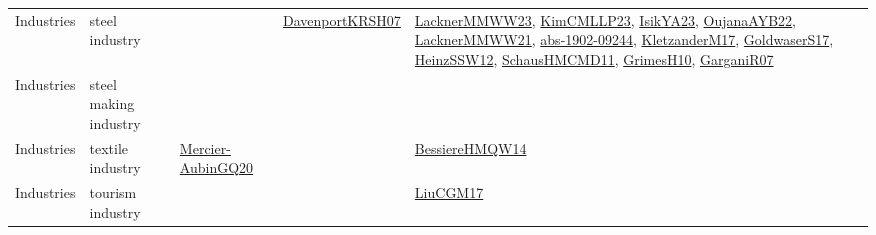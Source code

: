 {\begin{longtable}{lp{3cm}>{\raggedright}p{6cm}>{\raggedright}p{6cm}p{8cm}}
Industries & steel industry &  & \href{papers/DavenportKRSH07.pdf}{DavenportKRSH07}\cite{DavenportKRSH07} & \href{articles/LacknerMMWW23.pdf}{LacknerMMWW23}\cite{LacknerMMWW23}, \href{papers/KimCMLLP23.pdf}{KimCMLLP23}\cite{KimCMLLP23}, \href{articles/IsikYA23.pdf}{IsikYA23}\cite{IsikYA23}, \href{papers/OujanaAYB22.pdf}{OujanaAYB22}\cite{OujanaAYB22}, \href{papers/LacknerMMWW21.pdf}{LacknerMMWW21}\cite{LacknerMMWW21}, \href{articles/abs-1902-09244.pdf}{abs-1902-09244}\cite{abs-1902-09244}, \href{papers/KletzanderM17.pdf}{KletzanderM17}\cite{KletzanderM17}, \href{papers/GoldwaserS17.pdf}{GoldwaserS17}\cite{GoldwaserS17}, \href{articles/HeinzSSW12.pdf}{HeinzSSW12}\cite{HeinzSSW12}, \href{articles/SchausHMCMD11.pdf}{SchausHMCMD11}\cite{SchausHMCMD11}, \href{papers/GrimesH10.pdf}{GrimesH10}\cite{GrimesH10}, \href{papers/GarganiR07.pdf}{GarganiR07}\cite{GarganiR07}\\
Industries & steel making industry &  &  & \\
Industries & textile industry & \href{papers/Mercier-AubinGQ20.pdf}{Mercier-AubinGQ20}\cite{Mercier-AubinGQ20} &  & \href{papers/BessiereHMQW14.pdf}{BessiereHMQW14}\cite{BessiereHMQW14}\\
Industries & tourism industry &  &  & \href{papers/LiuCGM17.pdf}{LiuCGM17}\cite{LiuCGM17}\\

\end{longtable}}
